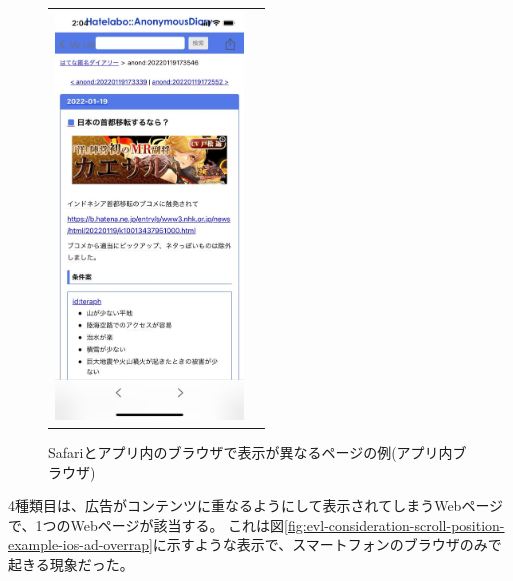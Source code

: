 \begin{figure}[htbp]
\begin{tabular}{cc}
    \begin{minipage}[t]{0.45\hsize}
      \caption{Safariとアプリ内のブラウザで表示が異なるページの例(アプリ内ブラウザ)}
      \label{fig:evl-consideration-scroll-position-ios-diff-wkwebview}
      \begin{center}
        \includegraphics[bb=0 0 585 1266,width=5cm]{img/060_evaluation/consideration/scroll_position/example/ios-diff-wkwebview.pdf}
      \end{center}
    \end{minipage}
  \end{tabular}
\end{figure}

4種類目は、広告がコンテンツに重なるようにして表示されてしまうWebページで、1つのWebページが該当する。
これは図\ref{fig:evl-consideration-scroll-position-example-ios-ad-overrap}に示すような表示で、スマートフォンのブラウザのみで起きる現象だった。

